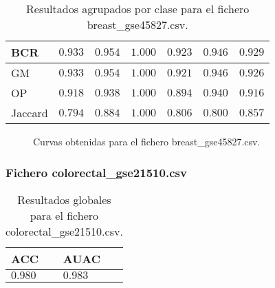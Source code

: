 \begin{table}[htp]
\begin{tabularx}{\columnwidth}{l Y Y Y Y Y Y}
        BCR     &  $0.933$      & $0.954$   & $1.000$    & $0.923$    & $0.946$    & $0.929$   \\\hline
        GM      &  $0.933$      & $0.954$   & $1.000$    & $0.921$    & $0.946$    & $0.926$   \\\hline
        OP      &  $0.918$      & $0.938$   & $1.000$    & $0.894$    & $0.940$    & $0.916$   \\\hline
        Jaccard &  $0.794$      & $0.884$   & $1.000$    & $0.806$    & $0.800$    & $0.857$   \\\hline
    \end{tabularx}
    \caption{Resultados agrupados por clase para el fichero breast\_gse45827.csv.}
    \label{tab:13}
\end{table}

\clearpage

\begin{figure}[htp]
    \centering
    \caption{Curvas obtenidas para el fichero breast\_gse45827.csv.}
    \label{fig:11}
\end{figure}

\bigbreak

\lipsum[1]

\clearpage


\subsubsection{Fichero colorectal\_gse21510.csv}

\begin{table}[htp]
    \small
    \centering
    \begin{tabularx}{\columnwidth}{Y Y}
        ACC       & AUAC    \\\hline
        $0.980$   & $0.983$ \\\hline
    \end{tabularx}
    \caption{Resultados globales para el fichero colorectal\_gse21510.csv.}
    \label{tab:14}
\end{table}

